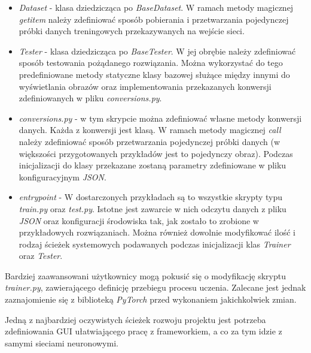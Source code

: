   \begin{itemize}
  \item \textit{Dataset} - klasa dziedzicząca po \textit{BaseDataset}. W ramach
  metody magicznej \textit{getitem} należy zdefiniować sposób pobierania i przetwarzania
  pojedynczej próbki danych treningowych przekazywanych na wejście sieci.

  \item \textit{Tester} - klasa dziedzicząca po \textit{BaseTester}. W jej obrębie
  należy zdefiniować sposób testowania pożądanego rozwiązania. Można wykorzystać
  do tego predefiniowane metody statyczne klasy bazowej służące między innymi
  do wyświetlania obrazów oraz implementowania przekazanych konwersji zdefiniowanych
  w pliku \textit{conversions.py}.

  \item \textit{conversions.py} - w tym skrypcie można zdefiniować własne metody
  konwersji danych. Każda z konwersji jest klasą. W ramach metody magicznej \textit{call}
  należy zdefiniować sposób przetwarzania pojedynczej próbki danych (w większości
  przygotowanych przykładów jest to pojedynczy obraz). Podczas inicjalizacji
  do klasy przekazane zostaną parametry zdefiniowane w pliku konfiguracyjnym
  \textit{JSON}.

  \item \textit{entrypoint} - W dostarczonych przykładach są to wszystkie
  skrypty typu \textit{train.py} oraz \textit{test.py}. Istotne jest
  zawarcie w nich odczytu danych z pliku \textit{JSON} oraz konfiguracji środowiska tak,
  jak zostało to zrobione w przykładowych rozwiązaniach. Można również dowolnie
  modyfikować ilość i rodzaj ścieżek systemowych podawanych podczas inicjalizacji
  klas \textit{Trainer} oraz \textit{Tester}.
  \end{itemize}

  Bardziej zaawansowani użytkownicy mogą pokusić się o modyfikację skryptu
  \textit{trainer.py}, zawierającego definicję przebiegu procesu uczenia.
  Zalecane jest jednak zaznajomienie się z biblioteką \textit{PyTorch} przed wykonaniem
  jakichkolwiek zmian.

  Jedną z najbardziej oczywistych ścieżek rozwoju projektu jest
  potrzeba zdefiniowania GUI ułatwiającego pracę z frameworkiem, a co
  za tym idzie z samymi sieciami neuronowymi.
